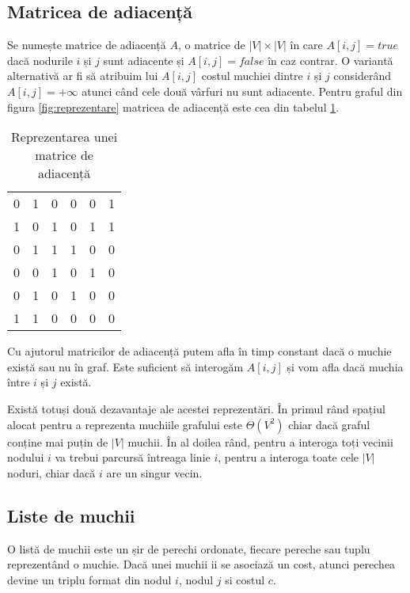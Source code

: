 \subsection{Matricea de adiacență}

Se numește matrice de adiacență $A$, o matrice de $\left |  V \right |\times \left |  V \right |$ în care $A[i,j]=true$ dacă nodurile $i$ și $j$ sunt adiacente și $A[i,j]=false$ în caz contrar. O variantă alternativă ar fi să atribuim lui $A[i,j]$ costul muchiei dintre $i$ și $j$ considerând $A[i,j]=+\infty$ atunci când cele două vârfuri nu sunt adiacente. Pentru graful din figura \ref{fig:reprezentare} matricea de adiacență este cea din tabelul \ref{table:adiacenta}.


\begin{table}[h]
	\centering
	\begin{tabular}{c c c c c c}
		0 & 1 & 0 & 0 & 0 & 1\\ 
		1 & 0 & 1 & 0 & 1 & 1\\ 
		0 & 1 & 1 & 1 & 0 & 0\\ 
		0 & 0 & 1 & 0 & 1 & 0\\ 
		0 & 1 & 0 & 1 & 0 & 0\\ 
		1 & 1 & 0 & 0 & 0 & 0\\ 
		
	\end{tabular}
	\caption{Reprezentarea unei matrice de adiacență}
	\label{table:adiacenta}
\end{table}

Cu ajutorul matricilor de adiacență putem afla în timp constant dacă o muchie există sau nu în graf. Este suficient să interogăm $A[i,j]$ și vom afla dacă muchia între $i$ și $j$ există. 

Există totuși două dezavantaje ale acestei reprezentări. În primul rând spațiul alocat pentru a reprezenta muchiile grafului este $\Theta(V^2)$ chiar dacă graful conține mai puțin de $\left |  V \right | $ muchii.
În al doilea rând, pentru a interoga toți vecinii nodului $i$ va trebui parcursă întreaga linie $i$, pentru a interoga toate cele $\left |  V \right | $ noduri, chiar dacă $i$ are un singur vecin.

\subsection{Liste de muchii}

O listă de muchii este un șir de perechi ordonate, fiecare pereche sau tuplu reprezentând o muchie. Dacă unei muchii ii se asociază un cost, atunci perechea devine un triplu format din nodul $i$, nodul $j$ si costul $c$.

